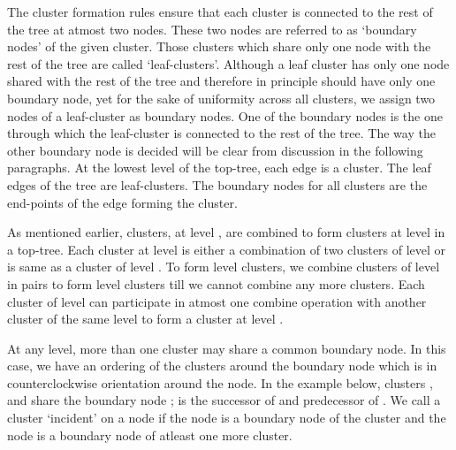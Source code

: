 \documentclass[a4paper,12pt]{article}
\begin{document}
The cluster formation rules ensure that each cluster is connected to the rest of the tree at atmost two nodes. These two nodes are referred to as `boundary nodes' of the given cluster. Those clusters which share only one node with the rest of the tree are called `leaf-clusters'. Although a leaf cluster has only one node shared with the rest of the tree and therefore in principle should have only one boundary node, yet for the sake of uniformity across all clusters, we assign two nodes of a leaf-cluster as boundary nodes. One of the boundary nodes is the one through which the leaf-cluster is connected to the rest of the tree. The way the other boundary node is decided will be clear from discussion in the following paragraphs. At the lowest level of the top-tree, each edge is a cluster. The leaf edges of the tree are leaf-clusters. The boundary nodes for all clusters are the end-points of the edge forming the cluster.

As mentioned earlier, clusters, at level , are combined to form clusters at level  in a top-tree. Each cluster at level  is either a combination of two clusters of level  or is same as a cluster of level . To form level  clusters, we combine clusters of level  in pairs to form level  clusters till we cannot combine any more clusters. Each cluster of level  can participate in atmost one combine operation with another cluster of the same level to form a cluster at level .

At any level, more than one cluster may share a common boundary node. In this case, we have an ordering of the clusters around the boundary node which is in counterclockwise orientation around the node. In the example below, clusters ,  and  share the boundary node ;  is the successor of  and predecessor of . We call a cluster `incident' on a node if the node is a boundary node of the cluster and the node is a boundary node of atleast one more cluster.
\end{document}
